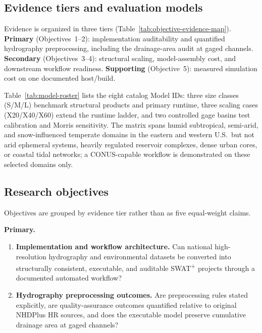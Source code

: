 \subsection{Evidence tiers and evaluation models}

Evidence is organized in three tiers (Table~\ref{tab:objective-evidence-map}). \textbf{Primary} (Objectives~1--2): implementation auditability and quantified hydrography preprocessing, including the drainage-area audit at gaged channels. \textbf{Secondary} (Objectives~3--4): structural scaling, model-assembly cost, and downstream workflow readiness. \textbf{Supporting} (Objective~5): measured simulation cost on one documented host/build.

Table~\ref{tab:model-roster} lists the eight catalog Model IDs: three size classes (S/M/L) benchmark structural products and primary runtime, three scaling cases (X20/X40/X60) extend the runtime ladder, and two controlled gage basins test calibration and Morris sensitivity. The matrix spans humid subtropical, semi-arid, and snow-influenced temperate domains in the eastern and western U.S.\ but not arid ephemeral systems, heavily regulated reservoir complexes, dense urban cores, or coastal tidal networks; a CONUS-capable workflow is demonstrated on these selected domains only.

\begin{table}[htbp]
  \centering
  \caption{Evaluation model sets (catalog Model IDs; full roster in archived \texttt{tab-model-roster.csv}).}
  \label{tab:model-roster}
  \footnotesize
  \setlength{\tabcolsep}{3pt}
  \renewcommand{\arraystretch}{1.08}
  \resizebox{\textwidth}{!}{%
  }
\end{table}

\subsection{Research objectives}

Objectives are grouped by evidence tier rather than as five equal-weight claims.

\textbf{Primary.}
\begin{enumerate}
  \item \textbf{Implementation and workflow architecture.} Can national high-resolution hydrography and environmental datasets be converted into structurally consistent, executable, and auditable SWAT\textsuperscript{+} projects through a documented automated workflow?
  \item \textbf{Hydrography preprocessing outcomes.} Are preprocessing rules stated explicitly, are quality-assurance outcomes quantified relative to original NHDPlus HR sources, and does the executable model preserve cumulative drainage area at gaged channels?
\end{enumerate}


